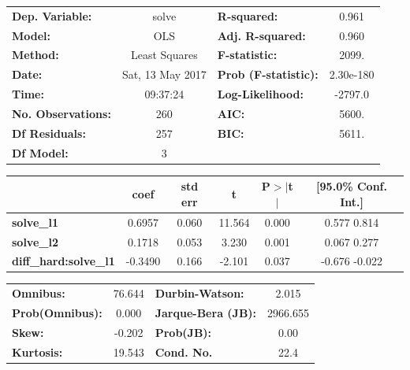 \documentclass{article}
\begin{document}
\begin{center}
\begin{tabular}{lclc}
\toprule
\textbf{Dep. Variable:}     &      solve       & \textbf{  R-squared:         } &     0.961   \\
\textbf{Model:}             &       OLS        & \textbf{  Adj. R-squared:    } &     0.960   \\
\textbf{Method:}            &  Least Squares   & \textbf{  F-statistic:       } &     2099.   \\
\textbf{Date:}              & Sat, 13 May 2017 & \textbf{  Prob (F-statistic):} & 2.30e-180   \\
\textbf{Time:}              &     09:37:24     & \textbf{  Log-Likelihood:    } &   -2797.0   \\
\textbf{No. Observations:}  &         260      & \textbf{  AIC:               } &     5600.   \\
\textbf{Df Residuals:}      &         257      & \textbf{  BIC:               } &     5611.   \\
\textbf{Df Model:}          &           3      & \textbf{                     } &             \\
\bottomrule
\end{tabular}
\begin{tabular}{lccccc}
                            & \textbf{coef} & \textbf{std err} & \textbf{t} & \textbf{P$>$$|$t$|$} & \textbf{[95.0\% Conf. Int.]}  \\
\midrule
\textbf{solve\_l1}           &       0.6957  &        0.060     &    11.564  &         0.000        &         0.577     0.814       \\
\textbf{solve\_l2}           &       0.1718  &        0.053     &     3.230  &         0.001        &         0.067     0.277       \\
\textbf{diff\_hard:solve\_l1} &      -0.3490  &        0.166     &    -2.101  &         0.037        &        -0.676    -0.022       \\
\bottomrule
\end{tabular}
\begin{tabular}{lclc}
\textbf{Omnibus:}       & 76.644 & \textbf{  Durbin-Watson:     } &    2.015  \\
\textbf{Prob(Omnibus):} &  0.000 & \textbf{  Jarque-Bera (JB):  } & 2966.655  \\
\textbf{Skew:}          & -0.202 & \textbf{  Prob(JB):          } &     0.00  \\
\textbf{Kurtosis:}      & 19.543 & \textbf{  Cond. No.          } &     22.4  \\
\bottomrule
\end{tabular}
\end{center}
\end{document}
